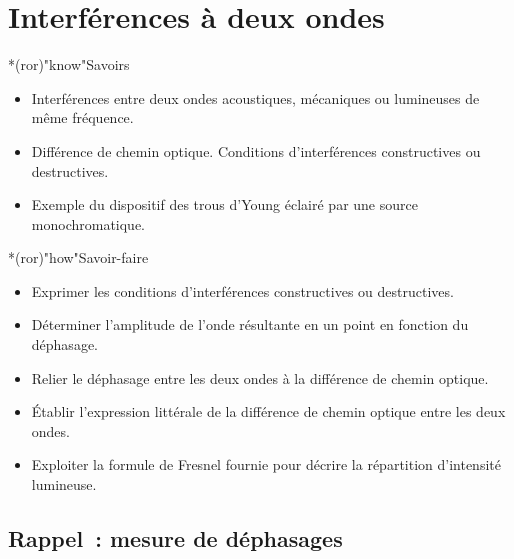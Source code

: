 \documentclass[../../main/main.tex]{subfiles}
\begin{document}
\setcounter{chapter}{1}

\chapter{Interf\'erences \`a deux ondes}

\vfill

\begin{prgm}
	\begin{tcb}*(ror)"know"{Savoirs}
		\begin{itemize}[label=$\diamond$, leftmargin=10pt]
			\item Interférences entre deux ondes acoustiques, mécaniques ou lumineuses
			      de même fréquence.
			\item Différence de chemin optique. Conditions d'interférences
			      constructives ou destructives.
			\item Exemple du dispositif des trous d'Young éclairé par une source
			      monochromatique.
		\end{itemize}
	\end{tcb}
	\begin{tcb}*(ror)"how"{Savoir-faire}
		\begin{itemize}[label=$\diamond$, leftmargin=10pt]
			\item Exprimer les conditions d'interférences constructives ou
			      destructives.
			\item Déterminer l'amplitude de l'onde résultante en un point en fonction
			      du déphasage.
			\item Relier le déphasage entre les deux ondes à la différence de chemin
			      optique.
			\item Établir l'expression littérale de la différence de chemin optique
			      entre les deux ondes.
			\item Exploiter la formule de Fresnel fournie pour décrire la répartition
			      d'intensité lumineuse.
		\end{itemize}
	\end{tcb}
\end{prgm}

\vfill


\vfill
\minitoc
\vfill

\newpage


\section{Rappel~: mesure de déphasages}
\end{document}
